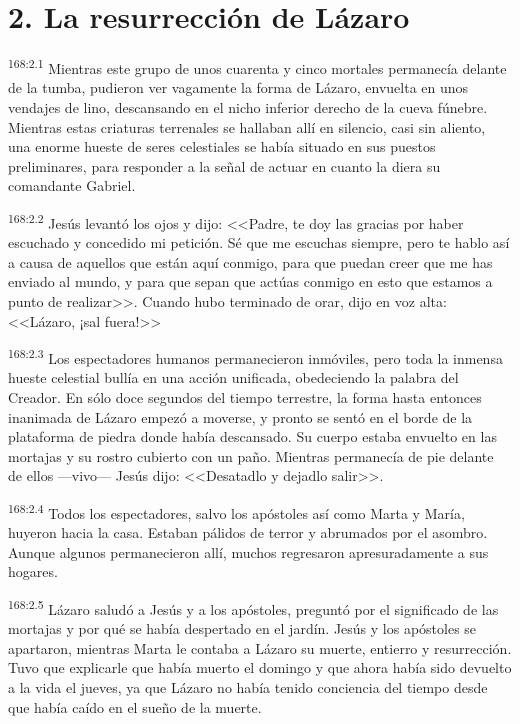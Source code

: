 \section*{2. La resurrección de Lázaro}
\par 
\textsuperscript{168:2.1} Mientras este grupo de unos cuarenta y cinco mortales permanecía delante de la tumba, pudieron ver vagamente la forma de Lázaro, envuelta en unos vendajes de lino, descansando en el nicho inferior derecho de la cueva fúnebre. Mientras estas criaturas terrenales se hallaban allí en silencio, casi sin aliento, una enorme hueste de seres celestiales se había situado en sus puestos preliminares, para responder a la señal de actuar en cuanto la diera su comandante Gabriel.

\par 
\textsuperscript{168:2.2} Jesús levantó los ojos y dijo: <<Padre, te doy las gracias por haber escuchado y concedido mi petición. Sé que me escuchas siempre, pero te hablo así a causa de aquellos que están aquí conmigo, para que puedan creer que me has enviado al mundo, y para que sepan que actúas conmigo en esto que estamos a punto de realizar>>. Cuando hubo terminado de orar, dijo en voz alta: <<Lázaro, ¡sal fuera!>>

\par 
\textsuperscript{168:2.3} Los espectadores humanos permanecieron inmóviles, pero toda la inmensa hueste celestial bullía en una acción unificada, obedeciendo la palabra del Creador. En sólo doce segundos del tiempo terrestre, la forma hasta entonces inanimada de Lázaro empezó a moverse, y pronto se sentó en el borde de la plataforma de piedra donde había descansado. Su cuerpo estaba envuelto en las mortajas y su rostro cubierto con un paño. Mientras permanecía de pie delante de ellos ---vivo--- Jesús dijo: <<Desatadlo y dejadlo salir>>.

\par 
\textsuperscript{168:2.4} Todos los espectadores, salvo los apóstoles así como Marta y María, huyeron hacia la casa. Estaban pálidos de terror y abrumados por el asombro. Aunque algunos permanecieron allí, muchos regresaron apresuradamente a sus hogares.

\par 
\textsuperscript{168:2.5} Lázaro saludó a Jesús y a los apóstoles, preguntó por el significado de las mortajas y por qué se había despertado en el jardín. Jesús y los apóstoles se apartaron, mientras Marta le contaba a Lázaro su muerte, entierro y resurrección. Tuvo que explicarle que había muerto el domingo y que ahora había sido devuelto a la vida el jueves, ya que Lázaro no había tenido conciencia del tiempo desde que había caído en el sueño de la muerte.

